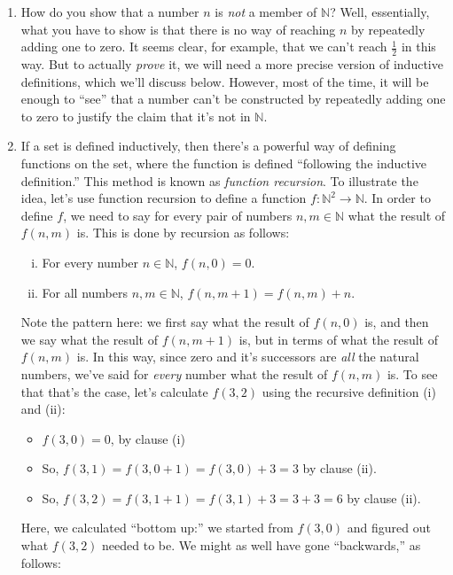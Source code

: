 \begin{enumerate}[{\thesection}.1]
	\item How do you show that a number $n$ is \emph{not} a member of $\mathbb{N}$? Well, essentially, what you have to show is that there is no way of reaching $n$ by repeatedly adding one to zero. It seems clear, for example, that we can't reach $\frac{1}{2}$ in this way. But to actually \emph{prove} it, we will need a more precise version of inductive definitions, which we'll discuss below. However, most of the time, it will be enough to ``see'' that a number can't be constructed by repeatedly adding one to zero to justify the claim that it's not in $\mathbb{N}$.
	
	\item If a set is defined inductively, then there's a powerful way of defining functions on the set, where the function is defined ``following the inductive definition.'' This method is known as \emph{function recursion}. To illustrate the idea, let's use function recursion to define a function $f:\mathbb{N}^2\to\mathbb{N}$. In order to define $f$, we need to say for every pair of numbers $n,m\in\mathbb{N}$ what the result of $f(n,m)$ is. This is done by recursion as follows:
	\begin{enumerate}[(i)]
	
		\item For every number $n\in\mathbb{N}$, $f(n, 0)=0$.
		
		\item For all numbers $n,m\in\mathbb{N}$, $f(n,m+1)=f(n,m)+n$.
	
	\end{enumerate}
Note the pattern here: we first say what the result of $f(n,0)$ is, and then we say what the result of $f(n,m+1)$ is, but in terms of what the result of $f(n,m)$ is. In this way, since zero and it's successors are \emph{all} the natural numbers, we've said for \emph{every} number what the result of $f(n,m)$ is. To see that that's the case, let's calculate $f(3,2)$ using the recursive definition (i) and (ii):

	\begin{itemize}
	
		\item $f(3, 0)=0$, by clause (i)
		
		\item So, $f(3,1)=f(3,0+1)=f(3,0)+3=3$ by clause (ii).
		
		\item So, $f(3,2)=f(3, 1+1)=f(3,1)+3=3+3=6$ by clause (ii).
			
	\end{itemize}
Here, we calculated ``bottom up:'' we started from $f(3,0)$ and figured out what $f(3,2)$ needed to be. We might as well have gone ``backwards,'' as follows: 
\begin{itemize}
	

\end{itemize}
\end{enumerate}

